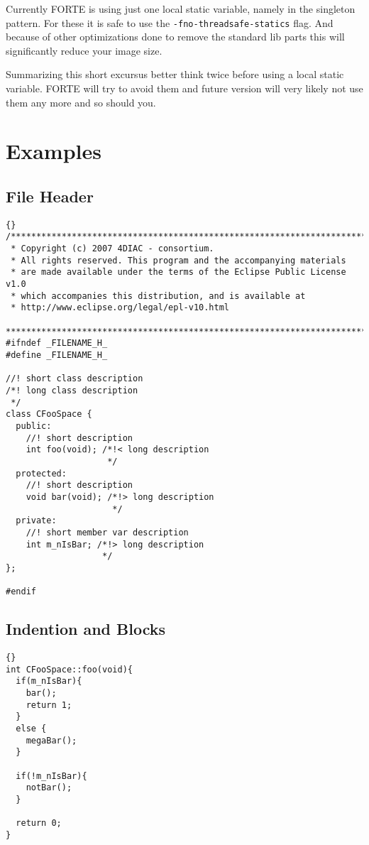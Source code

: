 \documentclass[final,a4paper,10pt, oneside]{article}
\begin{document}
Currently FORTE is using just one local static variable, namely in the singleton pattern. For these it is safe to use the \verb=-fno-threadsafe-statics= flag. And because of other optimizations done to remove the standard lib parts this will significantly reduce your image size. 

Summarizing this short excursus better think twice before using a local static variable. FORTE will try to avoid them and future version will very likely not use them any more and so should you.


\appendix
\section{Examples}
\subsection{File Header} \label{subsec:FileHeader}

\begin{lstlisting}[frame=trbl]{}
/*******************************************************************************
 * Copyright (c) 2007 4DIAC - consortium.
 * All rights reserved. This program and the accompanying materials
 * are made available under the terms of the Eclipse Public License v1.0
 * which accompanies this distribution, and is available at
 * http://www.eclipse.org/legal/epl-v10.html
 *******************************************************************************
#ifndef _FILENAME_H_  
#define _FILENAME_H_  

//! short class description
/*! long class description
 */
class CFooSpace {
  public:
    //! short description
    int foo(void); /*!< long description
                    */   
  protected:
    //! short description
    void bar(void); /*!> long description
                     */
  private:
    //! short member var description
    int m_nIsBar; /*!> long description
                   */  
};

#endif
\end{lstlisting}

\newpage
\subsection{Indention and Blocks} \label{subsec:IndentionAndBlocks}
\begin{lstlisting}[frame=trbl]{}
int CFooSpace::foo(void){
  if(m_nIsBar){
    bar();
    return 1;
  }
  else {
    megaBar();
  }
    
  if(!m_nIsBar){
  	notBar();  
  }
  
  return 0;
}
\end{lstlisting}
\end{document}
